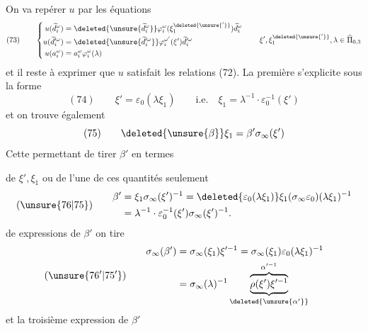 On va repérer $u$ par les équations
\[
(73)\qquad\left\{\begin{aligned}
u(\widetilde d_i^\omega)&=\deleted{\unsure{\widetilde d_i^\omega}}\varphi_i^\omega(\xi_1^{\deleted{\unsure{'}}})\widetilde d_i^\omega\\
u(\widetilde d_i^{\prime\omega})&=\deleted{\unsure{\widetilde d_i^{\prime\omega}}}\varphi_i^{\omega'}(\xi')\widetilde d_i^{\prime\omega}\\
u(a_i^\omega)&=a_i^\omega\varphi_i^\omega(\lambda)
\end{aligned}\right.\qquad \xi',\xi_1^{\deleted{\unsure{'}}},\lambda\in\widehat\Pi_{0,3}
\]
et il reste à exprimer que $u$ satisfait les relations (72). La première s'explicite sous la forme
\[
(74)\qquad\xi'=\varepsilon_0(\lambda\xi_1)\qquad\text{i.e.}\quad\xi_1=\lambda^{-1}\cdot\varepsilon_0^{-1}(\xi')
\]
et on trouve également
\[
(75)\qquad\deleted{\unsure{\beta}}\xi_1=\beta'\sigma_\infty(\xi')
\]
Cette  permettant de tirer $\beta'$ en termes

de $\xi',\xi_1$ ou de l'une de ces quantités seulement
\[
(\unsure{76|75})\qquad\begin{aligned}
\beta'&=\xi_1\sigma_\infty(\xi')^{-1}=\deleted{\varepsilon_0(\lambda\xi_1)}\xi_1(\sigma_\infty\varepsilon_0)(\lambda\xi_1)^{-1}\\
&=\lambda^{-1}\cdot\varepsilon_0^{-1}(\xi')\sigma_\infty(\xi')^{-1}.
\end{aligned}
\]
de   expressions de $\beta'$ on tire
\[
(\unsure{76'|75'})\qquad\begin{aligned}
\sigma_\infty(\beta')&=\sigma_\infty(\xi_1)\xi'^{-1}=\sigma_\infty(\xi_1)\varepsilon_0(\lambda\xi_1)^{-1}\\
&=\sigma_\infty(\lambda)^{-1}\underbrace{\overbrace{\rho(\xi')\xi'^{-1}}^{\alpha'^{-1}}}_{\deleted{\unsure{\alpha'}}}
\end{aligned}
\]
et la troisième expression de $\beta'$ 

